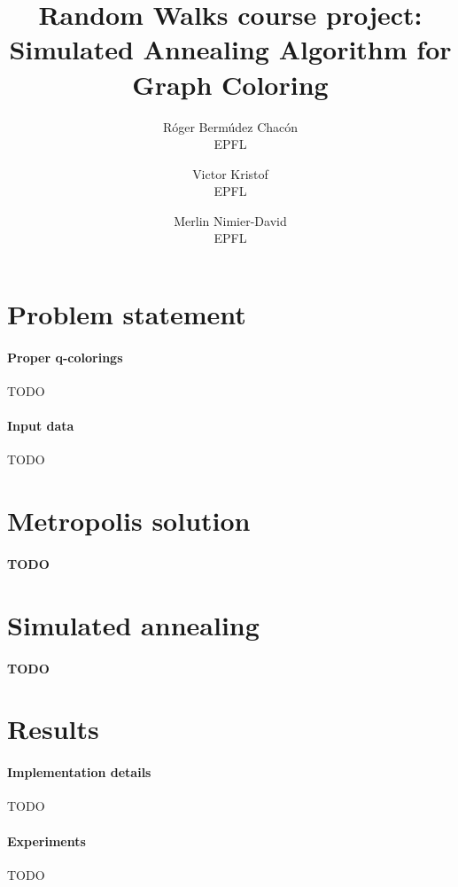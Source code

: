 \documentclass{report}
\title{Random Walks course project: Simulated Annealing Algorithm for Graph Coloring}
\author{
  Róger Bermúdez Chacón\\EPFL
  \and
  Victor Kristof\\EPFL
  \and
  Merlin Nimier-David\\EPFL
}
\begin{document}
  \maketitle

  \section*{Problem statement}
  \paragraph{Proper q-colorings}
  TODO

  \paragraph{Input data}
  TODO

  \section*{Metropolis solution}
  \paragraph{TODO}

  \section*{Simulated annealing}
  \paragraph{TODO}

  \section*{Results}
  \paragraph{Implementation details}
  TODO

  \paragraph{Experiments}
  TODO
\end{document}
